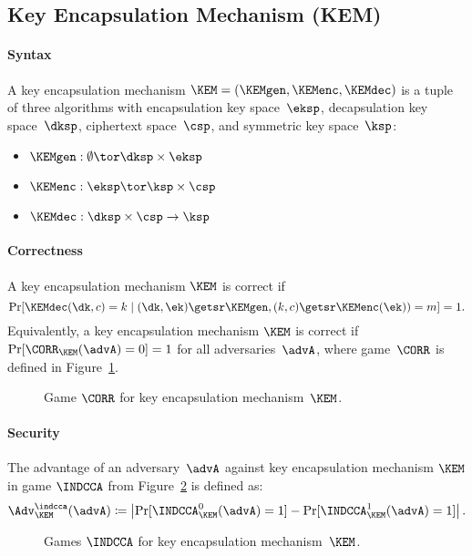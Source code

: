 \documentclass[a4paper,orivec]{llncs}
\begin{document}
\subsection{Key Encapsulation Mechanism (KEM)}

\paragraph{Syntax}
A key encapsulation mechanism $\KEM=(\KEMgen,\KEMenc,\KEMdec)$ is a tuple of three algorithms with encapsulation key space~$\eksp$, decapsulation key space~$\dksp$, ciphertext space~$\csp$, and symmetric key space~$\ksp$:

\begin{itemize}
    \item $\KEMgen: \emptyset \tor \dksp\times\eksp$
    \item $\KEMenc: \eksp \tor \ksp\times\csp$
    \item $\KEMdec: \dksp\times\csp \to \ksp$
\end{itemize}

\paragraph{Correctness}
A key encapsulation mechanism $\KEM$ is correct if
\[
\Pr[\KEMdec(\dk,c)=k\mid (\dk,\ek)\getsr\KEMgen,(k,c)\getsr\KEMenc(\ek))=m]=1\text{.}
\]
Equivalently, a key encapsulation mechanism $\KEM$ is correct if $\Pr[\CORR_{\KEM}(\advA)=0]=1$ for all adversaries~$\advA$, where game~$\CORR$ is defined in Figure~\ref{fig:kem:corr}.

\begin{figure}[!ht]
    \centering
    \nicoresetlinenr%
    \fbox{%
        \scalebox{\codescalefactor}{%
        }%
    }
    \caption{%
        Game $\CORR$ for key encapsulation mechanism~$\KEM$.
    }
    \label{fig:kem:corr}
\end{figure}

\paragraph{Security}
The advantage of an adversary~$\advA$ against key encapsulation mechanism $\KEM$ in game $\INDCCA$ from Figure~\ref{fig:kem:ind} is defined as:
\[
\Adv_\KEM^\indcca(\advA)\coloneqq\left|\Pr[\INDCCA_{\KEM}^0(\advA)=1]-\Pr[\INDCCA_{\KEM}^1(\advA)=1]\right|\text{.}
\]

\begin{figure}[!ht]
    \centering
    \nicoresetlinenr%
    \fbox{%
        \scalebox{\codescalefactor}{%
        }%
    }
    \caption{%
        Games $\INDCCA$ for key encapsulation mechanism~$\KEM$.
    }
    \label{fig:kem:ind}
\end{figure}
\end{document}
